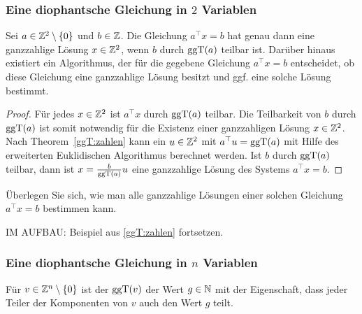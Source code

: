 	
	\subsubsection{Eine diophantsche Gleichung in $2$ Variablen} 
	
	\begin{thm} 
		Sei $a \in \mathbb Z^2 \setminus \{0\}$ und $b \in \mathbb Z$. Die Gleichung $a^\top x = b$ hat genau dann eine ganzzahlige Lösung $x \in \mathbb Z^2$, wenn $b$ durch $\operatorname{ggT}(a)$ teilbar ist. Darüber hinaus existiert ein Algorithmus, der für die gegebene Gleichung $a^\top x = b$ entscheidet, ob diese Gleichung eine ganzzahlige Lösung besitzt und ggf. eine solche Lösung bestimmt. 
	\end{thm} 
	\begin{proof} 
		Für jedes $x \in \mathbb Z^2$ ist $a^\top x$ durch $\operatorname{ggT}(a)$ teilbar. Die Teilbarkeit von $b$ durch $\operatorname{ggT}(a)$ ist somit notwendig für die Existenz einer ganzzahligen Lösung $x \in \mathbb Z^2$. Nach Theorem~\ref{ggT:zahlen} kann ein  $u \in \mathbb Z^2$ mit $a^\top u = \operatorname{ggT}(a)$ mit Hilfe des erweiterten Euklidischen Algorithmus berechnet werden. Ist $b$ durch $\operatorname{ggT}(a)$ teilbar, dann ist $ x= \frac{b}{\operatorname{ggT}(a)} u$ eine ganzzahlige Lösung des Systems $a^\top x = b$. 
	\end{proof} 
	
	\begin{bem}
		Überlegen Sie sich, wie man alle ganzzahlige Lösungen einer solchen Gleichung $a^\top x = b$ bestimmen kann. 
	\end{bem} 
	
	\begin{bsp} 
		IM AUFBAU: Beispiel aus \ref{ggT:zahlen} fortsetzen. 
	\end{bsp} 
	
	\subsubsection{Eine diophantsche Gleichung in  $n$ Variablen} 
	
	Für $v \in \mathbb Z^n \setminus \{0\}$ ist der $\operatorname{ggT}(v)$ der Wert $g \in \mathbb N$ mit der Eigenschaft, dass jeder Teiler der Komponenten von $v$ auch den Wert $g$ teilt. 
	
